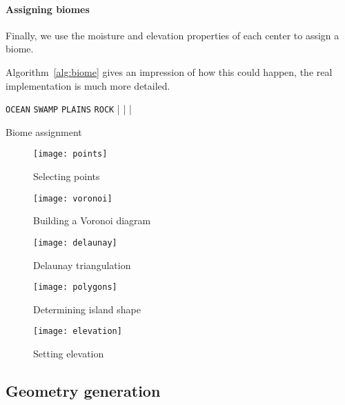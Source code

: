 \paragraph{Assigning biomes}

Finally, we use the moisture and elevation properties of each center to assign a biome.

Algorithm~\ref{alg:biome} gives an impression of how this could happen, the real implementation is much more detailed.

\begin{algo*}
\begin{sourcecode}
	\return \texttt{OCEAN}
\qelse
		\return \texttt{SWAMP}
	\qelse
			\return \texttt{PLAINS}
		\qelse
			\return \texttt{ROCK}
		|
	|
|
\qend
\end{sourcecode}
	\caption{Biome assignment}
	\label{alg:biome}
\end{algo*}

\begin{figure}
	\centering
	\texttt{[image: points]}
	\caption{Selecting points}
	\label{fig:algo:points}
\end{figure}

\begin{figure}
	\centering
	\texttt{[image: voronoi]}
	\caption{Building a Voronoi diagram}
	\label{fig:algo:voronoi}
\end{figure}

\begin{figure}
	\centering
	\texttt{[image: delaunay]}
	\caption{Delaunay triangulation}
	\label{fig:algo:delaunay}
\end{figure}

\begin{figure}
	\centering
	\texttt{[image: polygons]}
	\caption{Determining island shape}
	\label{fig:algo:polygons}
\end{figure}

\begin{figure}
	\centering
	\texttt{[image: elevation]}
	\caption{Setting elevation}
	\label{fig:algo:elevation}
\end{figure}


\subsection{Geometry generation}

